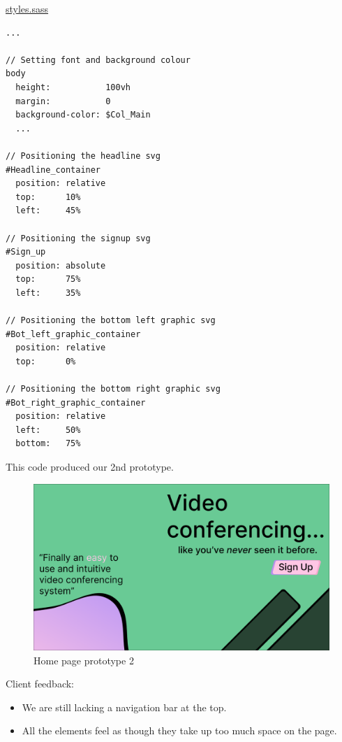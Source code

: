 \underline{styles.sass}
\begin{verbatim}
...

// Setting font and background colour
body
  height:           100vh
  margin:           0
  background-color: $Col_Main
  ...

// Positioning the headline svg
#Headline_container
  position: relative
  top:      10%
  left:     45%

// Positioning the signup svg
#Sign_up
  position: absolute
  top:      75%
  left:     35%

// Positioning the bottom left graphic svg
#Bot_left_graphic_container
  position: relative
  top:      0%

// Positioning the bottom right graphic svg
#Bot_right_graphic_container
  position: relative
  left:     50%
  bottom:   75%
\end{verbatim}

This code produced our 2nd prototype.

\begin{figure}[H]
\centering

\includegraphics[scale=0.2]{Images/Proto_home2.png}

\caption{Home page prototype 2}
\end{figure}

{\color{gray} \hrulefill} \vspace{0.2cm}

{\sffamily Client feedback:}

\begin{itemize}
  \item We are still lacking a navigation bar at the top.
  \item All the elements feel as though they take up too much space on the page.
\end{itemize}

